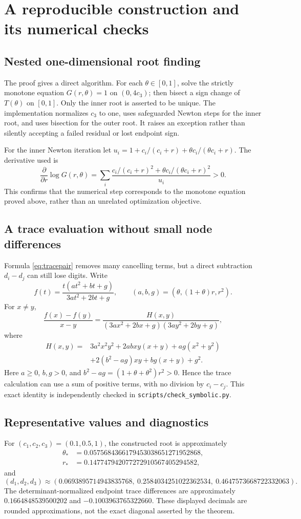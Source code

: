 \documentclass[11pt]{article}
\theoremstyle{remark}
\begin{document}
\section{A reproducible construction and its numerical checks}
\subsection{Nested one-dimensional root finding}
The proof gives a direct algorithm. For each $\theta\in[0,1]$, solve the
strictly monotone equation $G(r,\theta)=1$ on $(0,4c_3)$; then bisect a sign
change of $T(\theta)$ on $[0,1]$. Only the inner root is asserted to be unique.
The implementation normalizes $c_3$ to one, uses safeguarded Newton steps for
the inner root, and uses bisection for the outer root. It raises an exception
rather than silently accepting a failed residual or lost endpoint sign.

For the inner Newton iteration let
$u_i=1+c_i/(c_i+r)+\theta c_i/(\theta c_i+r)$. The derivative used is
\[
 \frac{\partial}{\partial r}\log G(r,\theta)
 =\sum_i\frac{c_i/(c_i+r)^2+\theta c_i/(\theta c_i+r)^2}{u_i}>0.
\]
This confirms that the numerical step corresponds to the monotone equation
proved above, rather than an unrelated optimization objective.

\subsection{A trace evaluation without small node differences}
Formula \eqref{eq:tracepair} removes many cancelling terms, but a direct
subtraction $d_i-d_j$ can still lose digits. Write
\[
 f(t)=\frac{t(at^2+bt+g)}{3at^2+2bt+g},\qquad
 (a,b,g)=(\theta,(1+\theta)r,r^2).
\]
For $x\ne y$,
\begin{equation}\label{eq:divdiff}
 \frac{f(x)-f(y)}{x-y}
  =\frac{H(x,y)}{(3ax^2+2bx+g)(3ay^2+2by+g)},
\end{equation}
where
\begin{align*}
 H(x,y)={}&3a^2x^2y^2+2abxy(x+y)+ag(x^2+y^2)\\
          &+2(b^2-ag)xy+bg(x+y)+g^2.
\end{align*}
Here $a\geq0$, $b,g>0$, and
$b^2-ag=(1+\theta+\theta^2)r^2>0$. Hence the trace calculation can use a sum
of positive terms, with no division by $c_i-c_j$. This exact identity is
independently checked in \texttt{scripts/check\_symbolic.py}.

\subsection{Representative values and diagnostics}
For $(c_1,c_2,c_3)=(0.1,0.5,1)$, the constructed root is approximately
\begin{align*}
 \theta_*&=0.0575684366179453038651271952868,\\
 r_*&=0.147747942077272910567405294582,
\end{align*}
and
\[
 (d_1,d_2,d_3)\approx
 (0.0693895714943835768,\ 0.2584034251022362534,\ 0.4647573668722332063).
\]
The determinant-normalized endpoint trace differences are approximately
$0.1664848539500202$ and $-0.1003963765322660$. These displayed decimals are
rounded approximations, not the exact diagonal asserted by the theorem.
\end{document}
